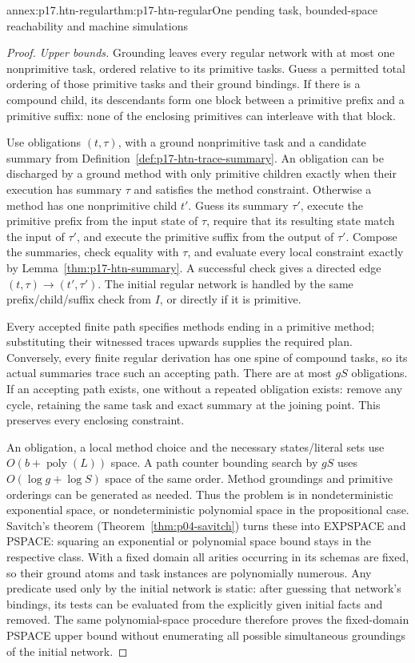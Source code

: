 \begin{annexitem}{annex:p17.htn-regular}{thm:p17-htn-regular}{One pending task, bounded-space reachability and machine simulations}
\begin{proof}
\emph{Upper bounds.} Grounding leaves every regular network with at most
one nonprimitive task, ordered relative to its primitive tasks. Guess a
permitted total ordering of those primitive tasks and their ground bindings.
If there is a compound child, its descendants form one block between a
primitive prefix and a primitive suffix: none of the enclosing primitives
can interleave with that block.

Use obligations \((t,\tau)\), with a ground nonprimitive task and a candidate
summary from Definition~\ref{def:p17-htn-trace-summary}. An obligation can
be discharged by a ground method with only primitive children exactly when
their execution has summary \(\tau\) and satisfies the method constraint.
Otherwise a method has one nonprimitive child \(t'\). Guess its summary
\(\tau'\), execute the primitive prefix from the input state of \(\tau\),
require that its resulting state match the input of \(\tau'\), and execute
the primitive suffix from the output of \(\tau'\). Compose the summaries,
check equality with \(\tau\), and evaluate every local constraint exactly
by Lemma~\ref{thm:p17-htn-summary}. A successful check gives a directed edge
\((t,\tau)\to(t',\tau')\). The initial regular network is handled by the
same prefix/child/suffix check from \(I\), or directly if it is primitive.

Every accepted finite path specifies methods ending in a primitive method;
substituting their witnessed traces upwards supplies the required plan.
Conversely, every finite regular derivation has one spine of compound tasks,
so its actual summaries trace such an accepting path. There are at most
\(gS\) obligations. If an accepting path exists, one without a repeated
obligation exists: remove any cycle, retaining the same task and exact
summary at the joining point. This preserves every enclosing constraint.

An obligation, a local method choice and the necessary states/literal sets
use \(O(b+\operatorname{poly}(L))\) space. A path counter bounding search
by \(gS\) uses \(O(\log g+\log S)\) space of the same order. Method
groundings and primitive orderings can be generated as needed. Thus the
problem is in nondeterministic exponential space, or nondeterministic
polynomial space in the propositional case. Savitch's theorem
(Theorem~\ref{thm:p04-savitch}) turns these into EXPSPACE and PSPACE:
squaring an exponential or polynomial space bound stays in the respective
class. With a fixed domain all arities occurring in its schemas are fixed,
so their ground atoms and task instances are polynomially numerous. Any
predicate used only by the initial network is static: after guessing that
network's bindings, its tests can be evaluated from the explicitly given
initial facts and removed. The same polynomial-space procedure therefore
proves the fixed-domain PSPACE upper bound without enumerating all possible
simultaneous groundings of the initial network.


\end{proof}
\end{annexitem}
